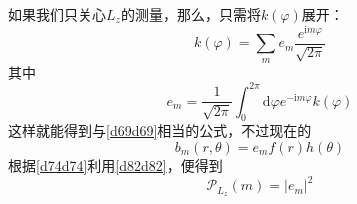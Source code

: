 \documentclass[]{article}
\begin{document}
如果我们只关心$L_z$的测量，那么，只需将$k(\varphi)$展开：
\begin{equation}
	k(\varphi)=\sum\limits_{m}e_m\dfrac{e^{\mathrm{i}m\varphi}}{\sqrt{2\pi}}
\end{equation}
其中
\begin{equation}
	e_m=\dfrac{1}{\sqrt{2\pi}}\int_{0}^{2\pi}\mathrm{d}\varphi e^{-\mathrm{i}m\varphi}k(\varphi)
\end{equation}
这样就能得到与\eqref{d69d69}相当的公式，不过现在的
\begin{equation}
	b_m(r,\theta)=e_mf(r)h(\theta)
\end{equation}
根据\eqref{d74d74}利用\eqref{d82d82}，便得到
\begin{equation}
	\mathscr{P}_{L_z}(m)=|e_m|^2
\end{equation}
\end{document}
